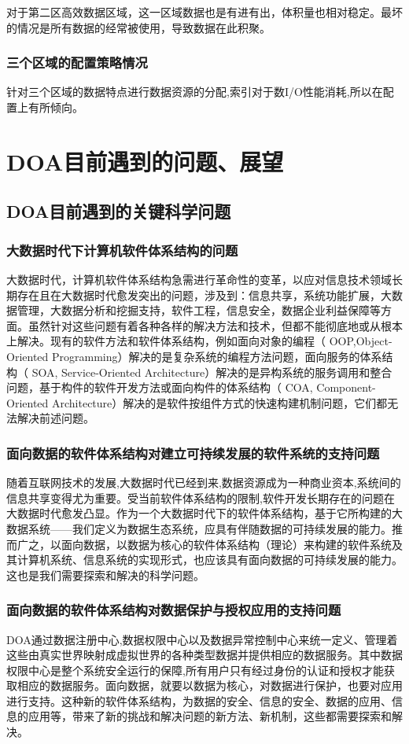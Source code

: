 \documentclass[article]{BJTU-thesis}
\begin{document}
	对于第二区高效数据区域，这一区域数据也是有进有出，体积量也相对稳定。最坏的情况是所有数据的经常被使用，导致数据在此积聚。
	\subsubsection{三个区域的配置策略情况}
	针对三个区域的数据特点进行数据资源的分配,索引对于数I/O性能消耗,所以在配置上有所倾向。
	
	\section{DOA目前遇到的问题、展望}
	\subsection{DOA目前遇到的关键科学问题}
	
	\subsubsection{大数据时代下计算机软件体系结构的问题}
	大数据时代，计算机软件体系结构急需进行革命性的变革，以应对信息技术领域长期存在且在大数据时代愈发突出的问题，涉及到：信息共享，系统功能扩展，大数据管理，大数据分析和挖掘支持，软件工程，信息安全，数据企业利益保障等方面\cite{za}。虽然针对这些问题有着各种各样的解决方法和技术，但都不能彻底地或从根本上解决。现有的软件方法和软件体系结构，例如面向对象的编程（ OOP,Object-Oriented Programming）解决的是复杂系统的编程方法问题，面向服务的体系结构（ SOA, Service-Oriented Architecture）解决的是异构系统的服务调用和整合问题，基于构件的软件开发方法或面向构件的体系结构（ COA, Component-Oriented Architecture）解决的是软件按组件方式的快速构建机制问题，它们都无法解决前述问题。
	
	\subsubsection{面向数据的软件体系结构对建立可持续发展的软件系统的支持问题}
	随着互联网技术的发展,大数据时代已经到来,数据资源成为一种商业资本,系统间的信息共享变得尤为重要。受当前软件体系结构的限制,软件开发长期存在的问题在大数据时代愈发凸显\cite{zb}。作为一个大数据时代下的软件体系结构，基于它所构建的大数据系统——我们定义为数据生态系统，应具有伴随数据的可持续发展的能力。推而广之，以面向数据，以数据为核心的软件体系结构（理论）来构建的软件系统及其计算机系统、信息系统的实现形式，也应该具有面向数据的可持续发展的能力。这也是我们需要探索和解决的科学问题。
	\subsubsection{面向数据的软件体系结构对数据保护与授权应用的支持问题}
	DOA通过数据注册中心,数据权限中心以及数据异常控制中心来统一定义、管理着这些由真实世界映射成虚拟世界的各种类型数据并提供相应的数据服务。其中数据权限中心是整个系统安全运行的保障,所有用户只有经过身份的认证和授权才能获取相应的数据服务\cite{zc}\cite{zd}。面向数据，就要以数据为核心，对数据进行保护，也要对应用进行支持。这种新的软件体系结构，为数据的安全、信息的安全、数据的应用、信息的应用等，带来了新的挑战和解决问题的新方法、新机制，这些都需要探索和解决。
	
\end{document}
